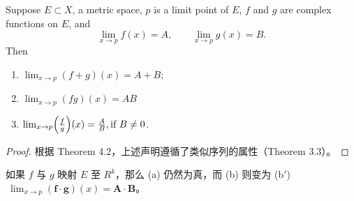 \documentclass[../poma-notes.tex]{subfiles}
\begin{document}
\begin{theorem}
  Suppose $E \subset X$, a metric space, $p$ is a limit point of $E$, $f$ and $g$ are complex functions on $E$, and
  \[
    \lim_{x \to p} f(x) = A, \qquad \lim_{x \to p} g(x) = B.
  \]
  Then
  \begin{enumerate}[label=(\alph*)]
    \item $\lim_{x \to p} (f+g)(x) = A + B$;
    \item $\lim_{x \to p} (fg)(x) = AB$
    \item $\lim_{x \to p} \Bigl(\frac{f}{g}\Bigr)(x) = \frac{A}{B}, \text{if } B \ne 0$.
  \end{enumerate}
\end{theorem}

\begin{proof}
  根据 Theorem 4.2，上述声明遵循了类似序列的属性（Theorem 3.3）。
\end{proof}

\begin{remark*}
  如果 $f$ 与 $g$ 映射 $E$ 至 $R^k$，那么 (a) 仍然为真，而 (b) 则变为
  (b$'$) $\ \lim_{x \to p}(\mathbf{f}\cdot\mathbf{g})(x) = \mathbf{A}\cdot\mathbf{B}$。
\end{remark*}
\end{document}
